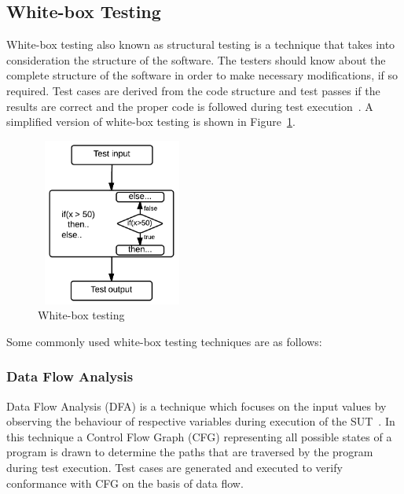 \subsection{White-box Testing}
White-box testing also known as structural testing is a technique that takes into consideration the structure of the software. The testers should know about the complete structure of the software in order to make necessary modifications, if so required. Test cases are derived from the code structure and test passes if the results are correct  and the proper code is followed during test execution~\cite{ostrand2002white}. A simplified version of white-box testing is shown in Figure~\ref{fig:whiteBox}. 
\bigskip
\begin{figure}[h]
\begin{center}
	\includegraphics[width=5cm, height=5.5cm ]{chapter2/whiteBox.png}
	\bigskip
	\caption{White-box testing}
	\label{fig:whiteBox}
\end{center}  
\end{figure}
\bigskip
Some commonly used white-box testing techniques are as follows:

\subsubsection{Data Flow Analysis}
Data Flow Analysis (DFA) is a technique which focuses on the input values by observing the behaviour of respective variables during execution of the SUT~\cite{clarke1989formal}. In this technique a Control Flow Graph (CFG) representing all possible states of a program is drawn to determine the paths that are traversed by the program during test execution. Test cases are generated and executed to verify conformance with CFG on the basis of data flow. 

